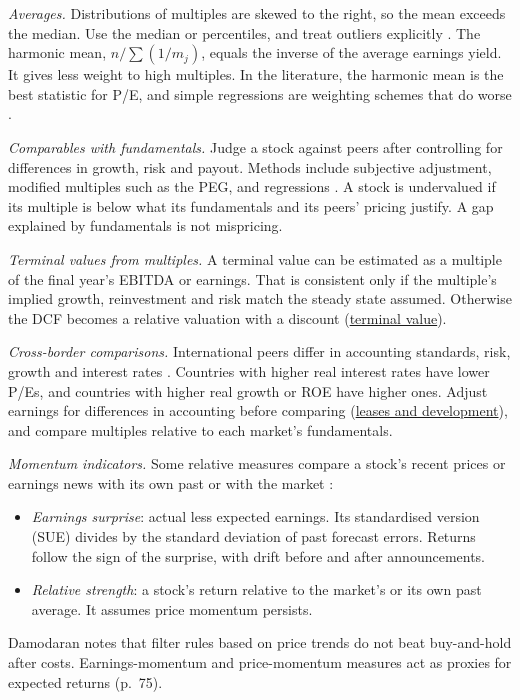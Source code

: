 \begin{qfmethod}\label{meth:comparables-evaluation}
 \emph{Averages.} Distributions of multiples are skewed to the right, so the mean exceeds the median. Use the median or percentiles, and treat outliers explicitly \citep[pp.~458--459]{investment-valuation-2012}. The harmonic mean, $n/\sum(1/m_j)$, equals the inverse of the average earnings yield. It gives less weight to high multiples. In the literature, the harmonic mean is the best statistic for P/E, and simple regressions are weighting schemes that do worse \citep[pp.~3--6]{optimal-multiples-2023}.

\emph{Comparables with fundamentals.} Judge a stock against peers after controlling for differences in growth, risk and payout. Methods include subjective adjustment, modified multiples such as the PEG, and regressions \citep[pp.~463--465]{investment-valuation-2012}. A stock is undervalued if its multiple is below what its fundamentals and its peers' pricing justify. A gap explained by fundamentals is not mispricing.

\emph{Terminal values from multiples.} A terminal value can be estimated as a multiple of the final year's EBITDA or earnings. That is consistent only if the multiple's implied growth, reinvestment and risk match the steady state assumed. Otherwise the DCF becomes a relative valuation with a discount (\hyperref[meth:forecast-horizon-steady-state]{terminal value}).

\emph{Cross-border comparisons.} International peers differ in accounting standards, risk, growth and interest rates \citep[pp.~463, 477--479]{investment-valuation-2012}. Countries with higher real interest rates have lower P/Es, and countries with higher real growth or ROE have higher ones. Adjust earnings for differences in accounting before comparing (\hyperref[meth:enterprise-value-multiples]{leases and development}), and compare multiples relative to each market's fundamentals.

\emph{Momentum indicators.} Some relative measures compare a stock's recent prices or earnings news with its own past or with the market \citep[pp.~124--125, 131--132]{investment-valuation-2012}:
\begin{itemize}
\item \emph{Earnings surprise}: actual less expected earnings. Its standardised version (SUE) divides by the standard deviation of past forecast errors. Returns follow the sign of the surprise, with drift before and after announcements.
\item \emph{Relative strength}: a stock's return relative to the market's or its own past average. It assumes price momentum persists.
\end{itemize}
Damodaran notes that filter rules based on price trends do not beat buy-and-hold after costs. Earnings-momentum and price-momentum measures act as proxies for expected returns (p.~75).


\end{qfmethod}

